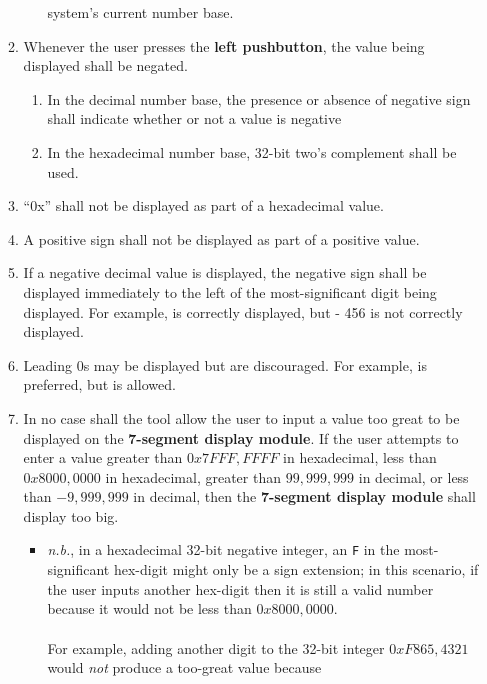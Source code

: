 \begin{enumerate}
\begin{enumerate}
\begin{enumerate}
            system's current number base.
        \end{enumerate}
    \item Whenever the user presses the \textbf{left pushbutton}, the value
        being displayed shall be negated.
        \begin{enumerate}
        \item In the decimal number base, the presence or absence of negative
            sign shall indicate whether or not a value is negative
        \item In the hexadecimal number base, 32-bit two's complement shall be
            used.
        \end{enumerate}
    \item ``0x'' shall not be displayed as part of a hexadecimal value.
    \item A positive sign shall not be displayed as part of a positive value.
    \item If a negative decimal value is displayed, the negative sign shall
        be displayed immediately to the left of the most-significant digit
        being displayed. For example, {} is correctly
        displayed, but {\dviiseg -    456} is not correctly displayed.
    \item Leading 0s may be displayed but are discouraged. For example,
        {} is preferred, but {} is allowed.
    \item In no case shall the tool allow the user to input a value too
        great to be displayed on the \textbf{7-segment display module}. If
        the user attempts to enter a value greater than $0x7FFF,FFFF$ in
        hexadecimal, less than $0x8000,0000$ in hexadecimal, greater than
        $99,999,999$ in decimal, or less than $-9,999,999$ in decimal, then the
        \textbf{7-segment display module} shall display {\dviiseg too big}.
        \begin{itemize}
        \item \textit{n.b.}, in a hexadecimal 32-bit negative integer, an
            \texttt{F} in the most-significant hex-digit might only be a sign
            extension; in this scenario, if the user inputs another hex-digit
            then it is still a valid number because it would not be less than
            $0x8000,0000$. \\ \\
            For example, adding another digit to the 32-bit integer
            $0xF865,4321$ would \textit{not} produce a too-great value because

\end{itemize}
\end{enumerate}
\end{enumerate}
